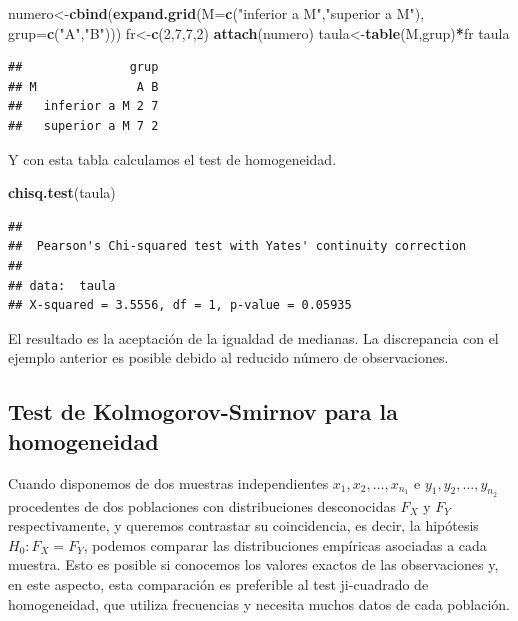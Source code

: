 \documentclass[
]{article}
\newenvironment{Shaded}{\begin{snugshade}}{\end{snugshade}}
\newcommand{\AttributeTok}[1]{\textcolor[rgb]{0.13,0.29,0.53}{#1}}
\newcommand{\DecValTok}[1]{\textcolor[rgb]{0.00,0.00,0.81}{#1}}
\newcommand{\FunctionTok}[1]{\textcolor[rgb]{0.13,0.29,0.53}{\textbf{#1}}}
\newcommand{\NormalTok}[1]{#1}
\newcommand{\OtherTok}[1]{\textcolor[rgb]{0.56,0.35,0.01}{#1}}
\newcommand{\SpecialCharTok}[1]{\textcolor[rgb]{0.81,0.36,0.00}{\textbf{#1}}}
\newcommand{\StringTok}[1]{\textcolor[rgb]{0.31,0.60,0.02}{#1}}
\begin{document}
\begin{Shaded}
\begin{Highlighting}[]
\NormalTok{numero}\OtherTok{\textless{}{-}}\FunctionTok{cbind}\NormalTok{(}\FunctionTok{expand.grid}\NormalTok{(}\AttributeTok{M=}\FunctionTok{c}\NormalTok{(}\StringTok{"inferior a M"}\NormalTok{,}\StringTok{"superior a M"}\NormalTok{),}
\AttributeTok{grup=}\FunctionTok{c}\NormalTok{(}\StringTok{"A"}\NormalTok{,}\StringTok{"B"}\NormalTok{)))}
\NormalTok{fr}\OtherTok{\textless{}{-}}\FunctionTok{c}\NormalTok{(}\DecValTok{2}\NormalTok{,}\DecValTok{7}\NormalTok{,}\DecValTok{7}\NormalTok{,}\DecValTok{2}\NormalTok{)}
\FunctionTok{attach}\NormalTok{(numero)}
\NormalTok{taula}\OtherTok{\textless{}{-}}\FunctionTok{table}\NormalTok{(M,grup)}\SpecialCharTok{*}\NormalTok{fr}
\NormalTok{taula}
\end{Highlighting}
\end{Shaded}

\begin{verbatim}
##               grup
## M              A B
##   inferior a M 2 7
##   superior a M 7 2
\end{verbatim}

Y con esta tabla calculamos el test de homogeneidad.

\begin{Shaded}
\begin{Highlighting}[]
\FunctionTok{chisq.test}\NormalTok{(taula)}
\end{Highlighting}
\end{Shaded}

\begin{verbatim}
## 
##  Pearson's Chi-squared test with Yates' continuity correction
## 
## data:  taula
## X-squared = 3.5556, df = 1, p-value = 0.05935
\end{verbatim}

El resultado es la aceptación de la igualdad de medianas. La discrepancia con el ejemplo anterior es posible debido al reducido número de observaciones.

\subsection{Test de Kolmogorov-Smirnov para la homogeneidad}\label{test-de-kolmogorov-smirnov-para-la-homogeneidad}

Cuando disponemos de dos muestras independientes \(x_{1}, x_{2}, \ldots, x_{n_{1}}\) e \(y_{1}, y_{2}, \ldots, y_{n_{2}}\) procedentes de dos poblaciones con distribuciones desconocidas \(F_{X}\) y \(F_{Y}\) respectivamente, y queremos contrastar su coincidencia, es decir, la hipótesis \(H_{0}: F_{X}=F_{Y}\), podemos comparar las distribuciones empíricas asociadas a cada muestra. Esto es posible si conocemos los valores exactos de las observaciones y, en este aspecto, esta comparación es preferible al test ji-cuadrado de homogeneidad, que utiliza frecuencias y necesita muchos datos de cada población.
\end{document}

